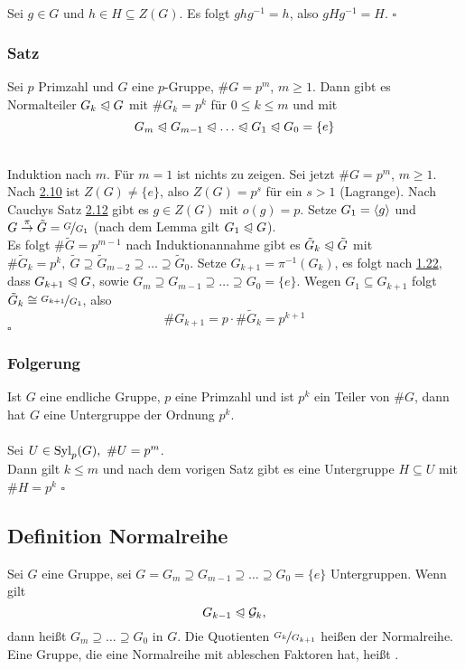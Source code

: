 \\
Sei $g\in G$ und $h\in H\subseteq Z(G)$. Es folgt $ghg^{-1}=h$, also $gHg^{-1}=H$.
\hfill $\square$

\subsubsection*{Satz}
Sei $p$ Primzahl und $G$ eine $p$-Gruppe, $\#G=p^m$, $m\ge 1$. Dann gibt es Normalteiler $G_k\trianglelefteqslant G$ mit $\#G_k=p^k$ für $0\le k\le m$ und mit \[ G_m\nt G_{m-1}\nt \dots \nt G_1\nt G_0=\{e\} \]

\\
Induktion nach $m$. Für $m=1$ ist nichts zu zeigen. Sei jetzt $\#G=p^m$, $m\ge 1$.\\
Nach \hyperref[sub:kor_zentrum]{2.10} ist $Z(G)\not=\{e\}$, also $Z(G)=p^s$ für ein $s>1$ (Lagrange). Nach Cauchys Satz \hyperref[sub:cauchys_satz]{2.12} gibt es $g\in Z(G)$ mit $o(g)=p$. Setze $G_1=\langle g \rangle$ und $G\stackrel{\pi}{\to}\tilde{G}=\nicefrac{G}{G_1}$ (nach dem Lemma gilt $G_1\trianglelefteqslant G$).\\
Es folgt $\#\tilde{G}=p^{m-1}$ nach Induktionannahme gibt es $\tilde{G}_k\trianglelefteqslant \tilde{G}$ mit $\#\tilde{G}_k=p^k,~\tilde{G}\supseteq \tilde{G}_{m-2}\supseteq \dots \supseteq \tilde{G}_0$. Setze $G_{k+1}=\pi^{-1}(G_k)$, es folgt nach \hyperref[sub:satz_eigenschaften]{1.22}, dass $G_{k+1}\trianglelefteqslant G$, sowie $G_m\supseteq G_{m-1}\supseteq \dots \supseteq G_0=\{e\}$. Wegen $G_1\subseteq G_{k+1}$ folgt $\tilde{G}_k\cong \nicefrac{G_{k+1}}{G_1}$, also \[\#G_{k+1}=p\cdot \#\tilde{G}_k=p^{k+1} \]
\hfill $\square$

\subsubsection*{Folgerung}
Ist $G$ eine endliche Gruppe, $p$ eine Primzahl und ist $p^k$ ein Teiler von $\#G$, dann hat $G$ eine Untergruppe der Ordnung $p^k$.\\

\\
Sei $U\in \operatorname{Syl}_p(G),~\#U=p^m$.\\
Dann gilt $k\le m$ und nach dem vorigen Satz gibt es eine Untergruppe $H\subseteq U$ mit $\#H=p^k$
\hfill $\square$

\subsection{Definition Normalreihe}
\label{sub:def_normalreihe}
Sei $G$ eine Gruppe, sei $G=G_m\supseteq G_{m-1}\supseteq \dots\supseteq G_0=\{e\}$ Untergruppen. Wenn gilt \[G_{k-1}\trianglelefteqslant \mathcal{G}_k, \]
dann heißt $G_m\supseteq \dots\supseteq G_0$  in $G$. Die Quotienten $\nicefrac{G_k}{G_{k+1}}$ heißen  der Normalreihe.\\
Eine Gruppe, die eine Normalreihe mit ableschen Faktoren hat, heißt .

